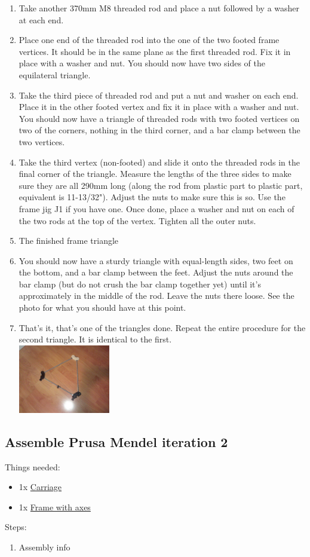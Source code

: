 \documentclass[11pt]{article}
\begin{document}
\begin{enumerate}
\item Take another 370mm M8 threaded rod and place a nut followed by a washer at each end.
\item Place one end of the threaded rod into the one of the two footed frame vertices. It should be in the same plane as the first threaded rod. Fix it in place with a washer and nut. You should now have two sides of the equilateral triangle.
\item Take the third piece of threaded rod and put a nut and washer on each end. Place it in the other footed vertex and fix it in place with a washer and nut. You should now have a triangle of threaded rods with two footed vertices on two of the corners, nothing in the third corner, and a bar clamp between the two vertices.
\item Take the third vertex (non-footed) and slide it onto the threaded rods in the final corner of the triangle. Measure the lengths of the three sides to make sure they are all 290mm long (along the rod from plastic part to plastic part, equivalent is 11-13/32"). Adjust the nuts to make sure this is so. Use the frame jig J1 if you have one. Once done, place a washer and nut on each of the two rods at the top of the vertex. Tighten all the outer nuts.
\item The finished frame triangle
\item You should now have a sturdy triangle with equal-length sides, two feet on the bottom, and a bar clamp between the feet. Adjust the nuts around the bar clamp (but do not crush the bar clamp together yet) until it's approximately in the middle of the rod. Leave the nuts there loose. See the photo for what you should have at this point.
\item That's it, that's one of the triangles done. Repeat the entire procedure for the second triangle. It is identical to the first.\\ \includegraphics[width=4cm]{images/frame/finished-triangle.jpg}
\end{enumerate}

\subsection{Assemble Prusa Mendel iteration 2}
Things needed:
\begin{itemize}
\item 1x \hyperlink{thing_carriage}{Carriage}
\item 1x \hyperlink{thing_frame-with-axes}{Frame with axes}
\end{itemize}
Steps:
\begin{enumerate}
\item Assembly info
\end{enumerate}

\newpage
\end{document}
